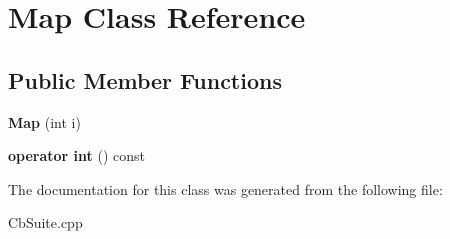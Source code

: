 \section{Map Class Reference}
\label{classMap}
\subsection*{Public Member Functions}
\begin{DoxyCompactItemize}
\item 
{\bfseries Map} (int i)\label{classMap_a4a86540a4ff75738fbc306c0b0e08e89}

\item 
{\bfseries operator int} () const \label{classMap_a3904cbf6983b740e5df6f8da85ef46cf}

\end{DoxyCompactItemize}


The documentation for this class was generated from the following file\+:\begin{DoxyCompactItemize}
\item 
Cb\+Suite.\+cpp\end{DoxyCompactItemize}
